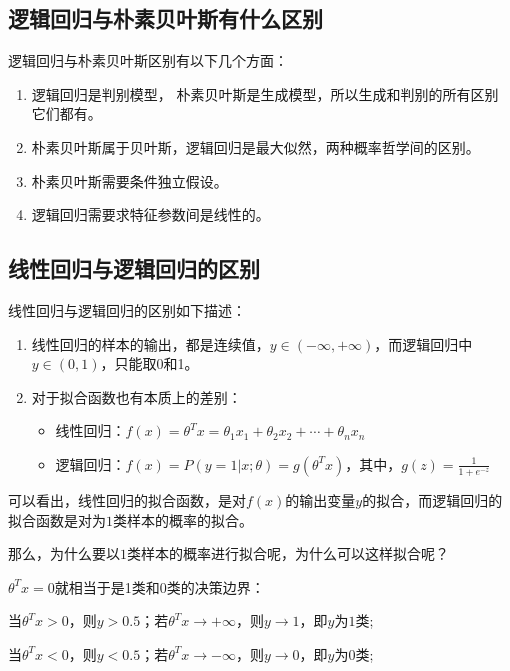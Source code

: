 \subsection{逻辑回归与朴素贝叶斯有什么区别}

逻辑回归与朴素贝叶斯区别有以下几个方面：

\begin{enumerate}
			\itemsep0em 
\item 逻辑回归是判别模型， 朴素贝叶斯是生成模型，所以生成和判别的所有区别它们都有。
\item 朴素贝叶斯属于贝叶斯，逻辑回归是最大似然，两种概率哲学间的区别。
\item 朴素贝叶斯需要条件独立假设。
\item 逻辑回归需要求特征参数间是线性的。
\end{enumerate}


\subsection{线性回归与逻辑回归的区别}

线性回归与逻辑回归的区别如下描述：

\begin{enumerate}
			\itemsep0em 
\item 线性回归的样本的输出，都是连续值，$ y\in (-\infty ,+\infty )$，而逻辑回归中$y\in (0,1)$，只能取0和1。
\item 对于拟合函数也有本质上的差别： 
	\begin{itemize}
			\itemsep0em 
		\item 线性回归：$f(x)=\theta ^{T}x=\theta _{1}x _{1}+\theta _{2}x _{2}+\cdots+\theta _{n}x _{n}$
		\item 逻辑回归：$f(x)=P(y=1|x;\theta )=g(\theta ^{T}x)$，其中，$g(z)=\frac{1}{1+e^{-z}}$
	\end{itemize}
\end{enumerate}

可以看出，线性回归的拟合函数，是对$f(x)$的输出变量$y$的拟合，而逻辑回归的拟合函数是对为$1$类样本的概率的拟合。

那么，为什么要以$1$类样本的概率进行拟合呢，为什么可以这样拟合呢？ 

$\theta ^{T}x=0$就相当于是1类和0类的决策边界： 

当$\theta ^{T}x>0$，则$y>0.5$；若$\theta ^{T}x\rightarrow +\infty $，则$y \rightarrow  1 $，即$y$为$1$类; 

当$\theta ^{T}x<0$，则$y<0.5$；若$\theta ^{T}x\rightarrow -\infty $，则$y \rightarrow  0 $，即$y$为$0$类; 

